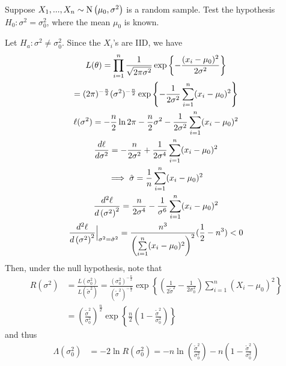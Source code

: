 \documentclass[notoc,notitlepage]{tufte-book}
\begin{document}
\begin{eg}[Example 7.5]
  Suppose $X_1, ..., X_n \sim \operatorname{N}\left(\mu_0, \sigma^2\right)$ is a random sample. Test the hypothesis $H_0 : \sigma^2 = \sigma_0^2$, where the mean $\mu_0$ is known.
\end{eg}

\begin{solution}
  Let $H_a : \sigma^2 \neq \sigma_0^2$. Since the $X_i$'s are IID, we have
  \begin{gather*}
    L(\theta) = \prod_{i=1}^{n} \frac{1}{\sqrt{2 \pi \sigma^2}} \exp\left\{ - \frac{(x_i - \mu_0)^2}{2 \sigma^2} \right\} \\
    = (2 \pi)^{- \frac{n}{2}} (\sigma^2)^{-\frac{n}{2}} \exp\left\{ - \frac{1}{2 \sigma^2} \sum_{i=1}^{n} (x_i - \mu_0)^2 \right\} \\
    \ell(\sigma^2) = - \frac{n}{2} \ln 2 \pi - \frac{n}{2} \sigma^2 - \frac{1}{2 \sigma^2} \sum_{i=1}^{n} (x_i - \mu_0)^2 \\
    \frac{d \ell}{d \sigma^2} = - \frac{n}{2 \sigma^2} + \frac{1}{2 \sigma^4} \sum_{i=1}^{n} (x_i - \mu_0)^2 \\
    \implies \hat{\sigma} = \frac{1}{n} \sum_{i=1}^{n} (x_i - \mu_0)^2 \\
    \frac{d^2 \ell}{d\left( \sigma^2 \right)^2} = \frac{n}{2 \sigma^4} - \frac{1}{\sigma^6} \sum_{i=1}^{n} (x_i - \mu_0)^2 \\
    \frac{d^2 \ell}{d\left( \sigma^2 \right)^2} \Big|_{\sigma^2 = \hat{\sigma}^2}^{} = \frac{n^3}{\left( \sum\limits_{i=1}^{n} (x_i - \mu_0)^2 \right)^2} ( \frac{1}{2} - n^3 ) < 0
  \end{gather*}
  Then, under the null hypothesis, note that
  \begin{align*}
    R(\sigma^2) &= \frac{L(\sigma_0^2)}{L(\tilde{\sigma}^2)} = \frac{\left( \sigma_0^2 \right)^{-\frac{n}{2}}}{\left( \tilde{\sigma}^2 \right)^{-\frac{n}{2}}} \exp\left\{ \left( \frac{1}{2 \tilde{\sigma}^2} - \frac{1}{2 \sigma_0^2} \right) \sum_{i=1}^{n} (X_i - \mu_0)^2 \right\} \\
                &= \left( \frac{\tilde{\sigma}^2}{\sigma_0^2} \right)^{\frac{n}{2}} \exp\left\{ \frac{n}{2} \left( 1 - \frac{\tilde{\sigma}^2}{\sigma_0^2} \right) \right\}
  \end{align*}
  and thus
  \begin{align*}
    \Lambda(\sigma_0^2) &= -2\ln R(\sigma_0^2) = - n \ln \left( \frac{\tilde{\sigma}^2}{\sigma_0^2} \right) - n \left(1 - \frac{\tilde{\sigma}^2}{\sigma_0^2}\right) \\

\end{align*}
\end{solution}
\end{document}
